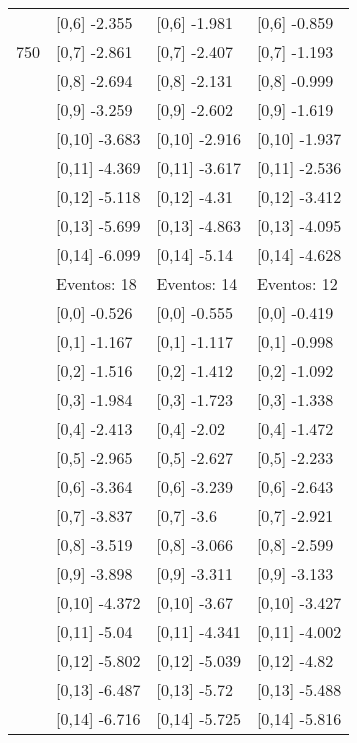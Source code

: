 \begin{table}
\begin{tabular}[t]{llll}
 & {}[0,6] -2.355 & {}[0,6] -1.981 & {}[0,6] -0.859\\
750 & {}[0,7] -2.861 & {}[0,7] -2.407 & {}[0,7] -1.193\\
\addlinespace
 & {}[0,8] -2.694 & {}[0,8] -2.131 & {}[0,8] -0.999\\
 & {}[0,9] -3.259 & {}[0,9] -2.602 & {}[0,9] -1.619\\
 & {}[0,10] -3.683 & {}[0,10] -2.916 & {}[0,10] -1.937\\
 & {}[0,11] -4.369 & {}[0,11] -3.617 & {}[0,11] -2.536\\
 & {}[0,12] -5.118 & {}[0,12] -4.31 & {}[0,12] -3.412\\
\addlinespace
 & {}[0,13] -5.699 & {}[0,13] -4.863 & {}[0,13] -4.095\\
 & {}[0,14] -6.099 & {}[0,14] -5.14 & {}[0,14] -4.628\\
 & Eventos:  18 & Eventos:  14 & Eventos:  12\\
 & {}[0,0] -0.526 & {}[0,0] -0.555 & {}[0,0] -0.419\\
 & {}[0,1] -1.167 & {}[0,1] -1.117 & {}[0,1] -0.998\\
\addlinespace
 & {}[0,2] -1.516 & {}[0,2] -1.412 & {}[0,2] -1.092\\
 & {}[0,3] -1.984 & {}[0,3] -1.723 & {}[0,3] -1.338\\
 & {}[0,4] -2.413 & {}[0,4] -2.02 & {}[0,4] -1.472\\
 & {}[0,5] -2.965 & {}[0,5] -2.627 & {}[0,5] -2.233\\
 & {}[0,6] -3.364 & {}[0,6] -3.239 & {}[0,6] -2.643\\
\addlinespace
1000 & {}[0,7] -3.837 & {}[0,7] -3.6 & {}[0,7] -2.921\\
 & {}[0,8] -3.519 & {}[0,8] -3.066 & {}[0,8] -2.599\\
 & {}[0,9] -3.898 & {}[0,9] -3.311 & {}[0,9] -3.133\\
 & {}[0,10] -4.372 & {}[0,10] -3.67 & {}[0,10] -3.427\\
 & {}[0,11] -5.04 & {}[0,11] -4.341 & {}[0,11] -4.002\\
\addlinespace
 & {}[0,12] -5.802 & {}[0,12] -5.039 & {}[0,12] -4.82\\
 & {}[0,13] -6.487 & {}[0,13] -5.72 & {}[0,13] -5.488\\
 & {}[0,14] -6.716 & {}[0,14] -5.725 & {}[0,14] -5.816\\
\bottomrule
\end{tabular}
\end{table}
